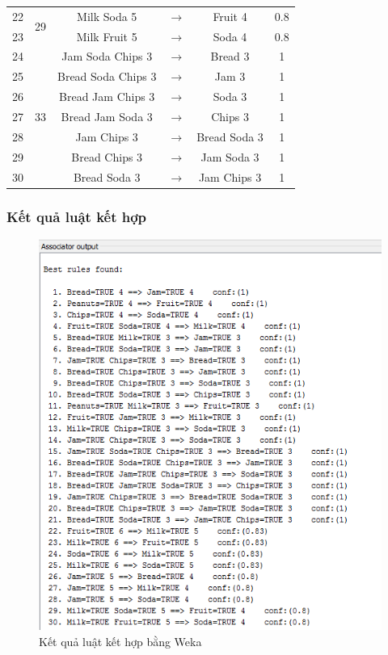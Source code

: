 \documentclass{article}
\begin{document}
\begin{table}[H]
\begin{longtable}{|c | c | c  c  c | c|}
	22& \multirow{2}{*}{29}&Milk Soda 5 & $\to$ & Fruit 4& 0.8\\
	23& &Milk Fruit 5 & $\to$ & Soda 4& 0.8\\ \hline	
	24& \multirow{7}{*}{33}&Jam Soda Chips 3 & $\to$ & Bread 3& 1\\
	25& &Bread Soda Chips 3 & $\to$ & Jam 3& 1\\
	26& &Bread Jam Chips 3 & $\to$ & Soda 3& 1\\
	27& &Bread Jam Soda 3 & $\to$ & Chips 3& 1\\
	28& &Jam Chips 3 & $\to$ & Bread Soda 3& 1\\
	29& &Bread Chips 3 & $\to$ & Jam Soda 3& 1\\
	30& &Bread Soda 3 & $\to$ & Jam Chips 3& 1\\
	\hline
\end{longtable}
\end{table}
\subsubsection{Kết quả luật kết hợp}
\begin{figure}[H]
	\centering
	\caption{Kết quả luật kết hợp bằng Weka}
	\includegraphics[scale = 0.7]{Rule}
\end{figure}
\end{document}
